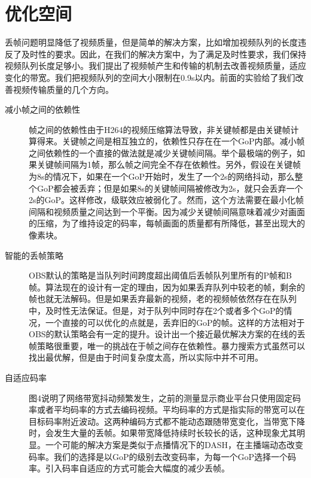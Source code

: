 \section{优化空间}
丢帧问题明显降低了视频质量，但是简单的解决方案，比如增加视频队列的长度违反了及时性的要求。因此，在我们的解决方案中，为了满足及时性要求，我们保持视频队列长度足够小。我们提出了视频帧产生和传输的机制去改善视频质量，适应变化的带宽。我们把视频队列的空间大小限制在0.9s以内。前面的实验给了我们改善视频传输质量的几个方向。

\begin{description}
  \item[减小帧之间的依赖性] 帧之间的依赖性由于H264的视频压缩算法导致，非关键帧都是由关键帧计算得来。关键帧之间是相互独立的，依赖性只存在在一个GoP内部。减小帧之间依赖性的一个直接的做法就是减少关键帧间隔。举个最极端的例子，如果关键帧间隔为1帧，那么帧之间完全不存在依赖性。另外，假设在关键帧为8s的情况下，如果在一个GoP开始时，发生了一个2s的网络抖动，那么整个GoP都会被丢弃；但是如果8s的关键帧间隔被修改为2s，就只会丢弃一个2s的GoP。这样修改，级联效应被弱化了。然而，这个方法需要在最小化帧间隔和视频质量之间达到一个平衡。因为减少关键帧间隔意味着减少对画面的压缩，为了维持设定的码率，每帧画面的质量都有所降低，甚至出现大的像素块。
  \item[智能的丢帧策略] OBS默认的策略是当队列时间跨度超出阈值后丢帧队列里所有的P帧和B帧。算法现在的设计有一定的理由，因为如果丢弃队列中较老的帧，剩余的帧也就无法解码。但是如果丢弃最新的视频，老的视频帧依然存在在队列中，及时性无法保证。但是，对于队列中同时存在2个或者多个GoP的情况，一个直接的可以优化的点就是，丢弃旧的GoP的帧。这样的方法相对于OBS的默认策略会有一定的提升。设计出一个接近最优解决方案的在线的丢帧策略很重要，唯一的挑战在于帧之间存在依赖性。暴力搜索方式虽然可以找出最优解，但是由于时间复杂度太高，所以实际中并不可用。
  \item[自适应码率] 图4说明了网络带宽抖动频繁发生，之前的测量显示商业平台只使用固定码率或者平均码率的方式去编码视频。平均码率的方式是指实际的带宽可以在目标码率附近波动。这两种编码方式都不能动态跟随带宽变化，当带宽下降时，会发生大量的丢帧。如果带宽降低持续时长较长的话，这种现象尤其明显。一个可能的解决方案是类似于点播情况下的DASH，在主播端动态改变码率。我们的选择是以GoP的级别去改变码率，为每一个GoP选择一个码率。引入码率自适应的方式可能会大幅度的减少丢帧。
\end{description}

